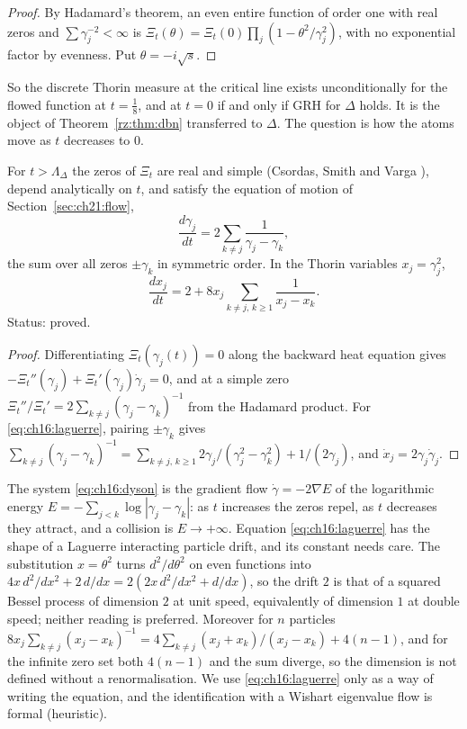 \begin{proof}
By Hadamard's theorem, an even entire function of order one with real zeros and $\sum\gamma_j^{-2}<\infty$ is $\Xi_t(\theta)=\Xi_t(0)\prod_j(1-\theta^2/\gamma_j^2)$, with no exponential factor by evenness. Put $\theta=-i\sqrt s$.
\end{proof}

So the discrete Thorin measure at the critical line exists unconditionally for the flowed function at $t=\frac18$, and at $t=0$ if and only if GRH for $\Delta$ holds. It is the object of Theorem~\ref{rz:thm:dbn} transferred to $\Delta$. The question is how the atoms move as $t$ decreases to $0$.

\begin{proposition}\label{prop:ch16:ode}
For $t>\Lambda_\Delta$ the zeros of $\Xi_t$ are real and simple (Csordas, Smith and Varga \cite{CSV94}), depend analytically on $t$, and satisfy the equation of motion of Section~\ref{sec:ch21:flow},
\begin{equation}\label{eq:ch16:dyson}
\frac{d\gamma_j}{dt}=2\sum_{k\ne j}\frac1{\gamma_j-\gamma_k},
\end{equation}
the sum over all zeros $\pm\gamma_k$ in symmetric order. In the Thorin variables $x_j=\gamma_j^2$,
\begin{equation}\label{eq:ch16:laguerre}
\frac{dx_j}{dt}=2+8x_j\sum_{k\ne j,\,k\ge1}\frac1{x_j-x_k}.
\end{equation}
Status: proved.
\end{proposition}

\begin{proof}
Differentiating $\Xi_t(\gamma_j(t))=0$ along the backward heat equation gives $-\Xi_t''(\gamma_j)+\Xi_t'(\gamma_j)\dot\gamma_j=0$, and at a simple zero $\Xi_t''/\Xi_t'=2\sum_{k\ne j}(\gamma_j-\gamma_k)^{-1}$ from the Hadamard product. For \eqref{eq:ch16:laguerre}, pairing $\pm\gamma_k$ gives $\sum_{k\ne j}(\gamma_j-\gamma_k)^{-1}=\sum_{k\ne j,\,k\ge1}2\gamma_j/(\gamma_j^2-\gamma_k^2)+1/(2\gamma_j)$, and $\dot x_j=2\gamma_j\dot\gamma_j$.
\end{proof}

The system \eqref{eq:ch16:dyson} is the gradient flow $\dot\gamma=-2\nabla E$ of the logarithmic energy $E=-\sum_{j<k}\log|\gamma_j-\gamma_k|$: as $t$ increases the zeros repel, as $t$ decreases they attract, and a collision is $E\to+\infty$. Equation \eqref{eq:ch16:laguerre} has the shape of a Laguerre interacting particle drift, and its constant needs care. The substitution $x=\theta^2$ turns $d^2/d\theta^2$ on even functions into $4x\,d^2/dx^2+2\,d/dx=2(2x\,d^2/dx^2+d/dx)$, so the drift $2$ is that of a squared Bessel process of dimension $2$ at unit speed, equivalently of dimension $1$ at double speed; neither reading is preferred. Moreover for $n$ particles $8x_j\sum_{k\ne j}(x_j-x_k)^{-1}=4\sum_{k\ne j}(x_j+x_k)/(x_j-x_k)+4(n-1)$, and for the infinite zero set both $4(n-1)$ and the sum diverge, so the dimension is not defined without a renormalisation. We use \eqref{eq:ch16:laguerre} only as a way of writing the equation, and the identification with a Wishart eigenvalue flow is formal (heuristic).

